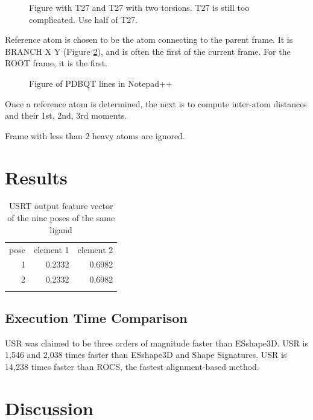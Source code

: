 \documentclass[twocolumn]{svjour3}          %
\begin{document}
\begin{figure}
\caption{Figure with T27 and T27 with two torsions. T27 is still too complicated. Use half of T27.}
\label{fig:2}
\end{figure}

Reference atom is chosen to be the atom connecting to the parent frame. It is BRANCH X Y (Figure \ref{}), and is often the first of the current frame. For the ROOT frame, it is the first.

\begin{figure}
\caption{Figure of PDBQT lines in Notepad++}
\label{fig:2}
\end{figure}

Once a reference atom is determined, the next is to compute inter-atom distances and their 1st, 2nd, 3rd moments.

Frame with less than 2 heavy atoms are ignored.

\section{Results}

\begin{table}
\caption{USRT output feature vector of the nine poses of the same ligand}
\label{tab:1}
\begin{tabular}{rrr}
\hline\noalign{\smallskip}
pose & element 1 & element 2\\
\noalign{\smallskip}\hline\noalign{\smallskip}
1 & 0.2332 & 0.6982\\
2 & 0.2332 & 0.6982\\
\noalign{\smallskip}\hline
\end{tabular}
\end{table}

\subsection{Execution Time Comparison}

USR was claimed to be three orders of magnitude faster than ESshape3D. USR is 1,546 and 2,038 times faster than ESshape3D and Shape Signatures. USR is 14,238 times faster than ROCS, the fastest alignment-based method.


\section{Discussion}

\end{document}
